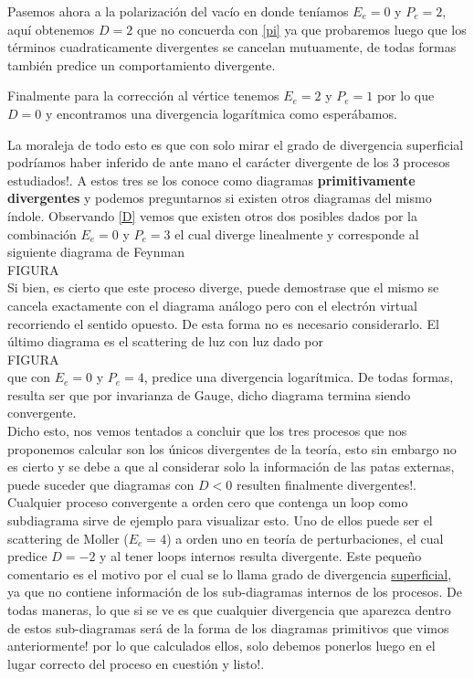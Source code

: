 \documentclass{article}
\numberwithin{equation}{section}
\begin{document}
Pasemos ahora a la polarización del vacío en donde teníamos $ E_e=0 $ y $ P_e=2 $, aquí obtenemos $ D=2 $ que no concuerda con \ref{pi} ya que probaremos luego que los términos cuadraticamente divergentes se cancelan mutuamente, de todas formas también predice un comportamiento divergente.

Finalmente para la corrección al vértice tenemos $ E_e=2 $ y $ P_e=1 $ por lo que $ D=0 $ y encontramos una divergencia logarítmica como esperábamos. 

La moraleja de todo esto es que con solo mirar el grado de divergencia superficial podríamos haber inferido de ante mano el carácter divergente de los 3 procesos estudiados!. A estos tres se los conoce como diagramas \textbf{primitivamente divergentes} y podemos preguntarnos si existen otros diagramas del mismo índole. Observando  \ref{D} vemos que existen otros dos posibles dados por la combinación $ E_e=0 $ y $ P_e=3 $ el cual diverge linealmente y corresponde al siguiente diagrama de Feynman\\

FIGURA\\

Si bien, es cierto que este proceso diverge, puede demostrase que el mismo se cancela exactamente con el diagrama análogo pero con el electrón virtual recorriendo el sentido opuesto. De esta forma no es necesario considerarlo. El último diagrama es el scattering de luz con luz dado por\\

FIGURA\\

que con $ E_e=0 $ y $ P_e=4 $, predice una divergencia logarítmica. De todas formas, resulta ser que por invarianza de Gauge, dicho diagrama termina siendo convergente.\\

Dicho esto, nos vemos tentados a concluir que los tres procesos que nos proponemos calcular son los únicos divergentes de la teoría, esto sin embargo no es cierto y se debe a que al considerar solo la información de las patas externas, puede suceder que diagramas con $ D<0 $ resulten finalmente divergentes!. Cualquier proceso convergente a orden cero que contenga un loop como subdiagrama sirve de ejemplo para visualizar esto. Uno de ellos puede ser el scattering de Moller ($ E_e=4 $) a orden uno en teoría de perturbaciones, el cual predice $ D=-2 $ y al tener loops internos resulta divergente. Este pequeño comentario es el motivo por el cual se lo llama grado de divergencia \underline{superficial}, ya que no contiene información de los sub-diagramas internos de los procesos. De todas maneras, lo que si se ve es que cualquier divergencia que aparezca dentro de estos sub-diagramas será de la forma de los diagramas primitivos que vimos anteriormente! por lo que calculados ellos, solo debemos ponerlos luego en el lugar correcto del proceso en cuestión y listo!.\\
\end{document}
